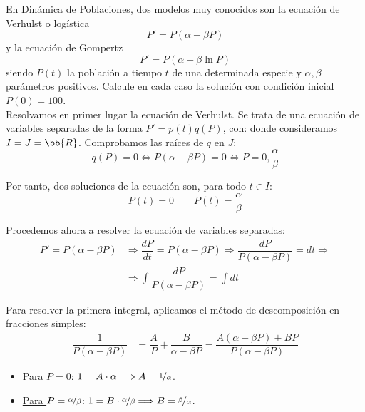 \begin{ejercicio}
    En Dinámica de Poblaciones, dos modelos muy conocidos son la ecuación de Verhulst o logística
    \begin{equation*}
        P' = P(\alpha - \beta P)
    \end{equation*}
    y la ecuación de Gompertz
    \begin{equation*}
        P' = P(\alpha - \beta \ln P)
    \end{equation*}
    siendo $P(t)$ la población a tiempo $t$ de una determinada especie y $\alpha, \beta$ parámetros positivos. Calcule en cada caso la solución con condición inicial $P(0) = 100$.\\

    Resolvamos en primer lugar la ecuación de Verhulst. Se trata de una ecuación de variables separadas de la forma $P' = p(t)q(P)$, con:
    donde consideramos $I=J=\bb{R}$. Comprobamos las raíces de $q$ en $J$:
    \begin{equation*}
        q(P) = 0 \Longleftrightarrow P(\alpha - \beta P) = 0 \Longleftrightarrow P=0, \dfrac{\alpha}{\beta}
    \end{equation*}

    Por tanto, dos soluciones de la ecuación son, para todo $t\in I$:
    \begin{equation*}
        P(t) = 0 \qquad P(t) = \dfrac{\alpha}{\beta}
    \end{equation*}

    Procedemos ahora a resolver la ecuación de variables separadas:
    \begin{align*}
        P' = P(\alpha - \beta P) &\Longrightarrow \dfrac{dP}{dt} = P(\alpha - \beta P) \Longrightarrow \dfrac{dP}{P(\alpha - \beta P)} = dt \Longrightarrow \\ &\Longrightarrow \int \dfrac{dP}{P(\alpha - \beta P)} = \int dt
    \end{align*}

    Para resolver la primera integral, aplicamos el método de descomposición en fracciones simples:
    \begin{align*}
        \dfrac{1}{P(\alpha - \beta P)} &= \dfrac{A}{P} + \dfrac{B}{\alpha - \beta P} = \dfrac{A(\alpha - \beta P) + BP}{P(\alpha - \beta P)}
    \end{align*}
    \begin{itemize}
        \item \ul{Para $P=0$}: $1=A \cdot \alpha \Longrightarrow A=\nicefrac{1}{\alpha}$.
        \item \ul{Para $P=\nicefrac{\alpha}{\beta}$}: $1=B \cdot \nicefrac{\alpha}{\beta} \Longrightarrow B=\nicefrac{\beta}{\alpha}$.
    \end{itemize}


\end{ejercicio}
